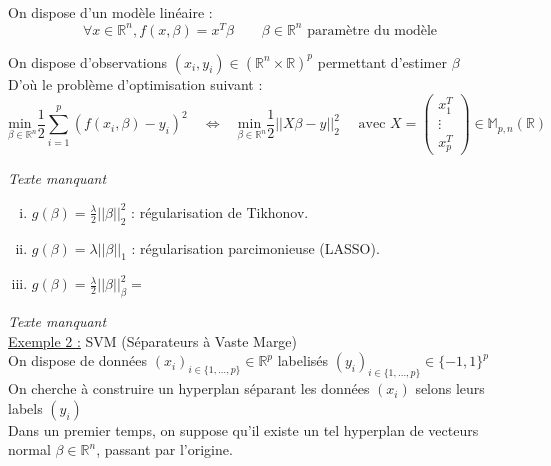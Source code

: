 \documentclass[12pt,a4paper]{article}
\begin{document}
On dispose d'un modèle linéaire :\\
$$
\forall x \in \mathbb{R}^n, f(x, \beta) = x^T \beta \quad \quad \beta \in \mathbb{R}^n \text{ paramètre du modèle}
$$

On dispose d'observations $(x_i, y_i) \in (\mathbb{R}^n \times \mathbb{R})^p$ permettant d'estimer $\beta$\\

D'où le problème d'optimisation suivant :\\
\begin{equation}
    \underset{\beta \in \mathbb{R}^n}{\text{min }} \frac{1}{2} \sum_{i=1}^p (f(x_i, \beta) - y_i)^2 \quad \Leftrightarrow \quad \underset{\beta \in \mathbb{R}^n}{\text{min }} \frac{1}{2} ||X\beta - y||_2^2 \quad \text{ avec } X = 
    \begin{pmatrix}
        x_1^T\\
        \vdots\\
        x_p^T
    \end{pmatrix}
    \in \mathbb{M}_{p,n}(\mathbb{R})
\end{equation}


\textit{Texte manquant}\\

\begin{enumerate}[i)]
    \item $g(\beta) = \frac{\lambda}{2}||\beta||_2^2$ : régularisation de Tikhonov.
    \item $g(\beta) = \lambda ||\beta||_1$ : régularisation parcimonieuse (LASSO).
    \item $g(\beta) = \frac{\lambda}{2}||\beta||_\beta^2 = $\\
\end{enumerate}

\textit{Texte manquant}\\


\underline{Exemple 2 :} SVM (Séparateurs à Vaste Marge)\\

On dispose de données $(x_i)_{i \in \{1, \dots, p\}} \in \mathbb{R}^p$ labelisés $(y_i)_{i \in \{1, \dots, p\}} \in \{-1, 1\}^p$\\
On cherche à construire un hyperplan séparant les données $(x_i)$ selons leurs labels $(y_i)$\\

Dans un premier temps, on suppose qu'il existe un tel hyperplan de vecteurs normal $\beta \in \mathbb{R}^n$, passant par l'origine.\\
\end{document}
